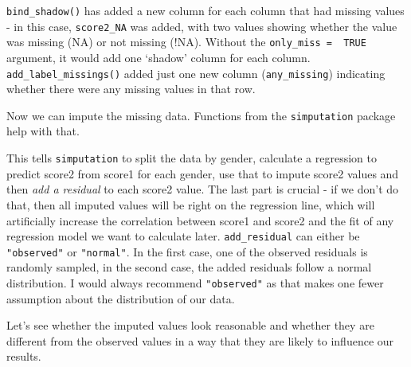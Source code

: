 \documentclass[
]{book}
\newenvironment{Shaded}{\begin{snugshade}}{\end{snugshade}}
\newcommand{\DataTypeTok}[1]{\textcolor[rgb]{0.13,0.29,0.53}{#1}}
\newcommand{\KeywordTok}[1]{\textcolor[rgb]{0.13,0.29,0.53}{\textbf{#1}}}
\newcommand{\NormalTok}[1]{#1}
\newcommand{\OperatorTok}[1]{\textcolor[rgb]{0.81,0.36,0.00}{\textbf{#1}}}
\newcommand{\StringTok}[1]{\textcolor[rgb]{0.31,0.60,0.02}{#1}}
\begin{document}
\texttt{bind\_shadow()} has added a new column for each column that had missing values - in this case, \texttt{score2\_NA} was added, with two values showing whether the value was missing (NA) or not missing (!NA). Without the \texttt{only\_miss\ =\ \ TRUE} argument, it would add one `shadow' column for each column. \texttt{add\_label\_missings()} added just one new column (\texttt{any\_missing}) indicating whether there were any missing values in that row.

Now we can impute the missing data. Functions from the \texttt{simputation} package help with that.

\begin{Shaded}
\end{Shaded}

This tells \texttt{simputation} to split the data by gender, calculate a regression to predict score2 from score1 for each gender, use that to impute score2 values and then \emph{add a residual} to each score2 value. The last part is crucial - if we don't do that, then all imputed values will be right on the regression line, which will artificially increase the correlation between score1 and score2 and the fit of any regression model we want to calculate later. \texttt{add\_residual} can either be \texttt{"observed"} or \texttt{"normal"}. In the first case, one of the observed residuals is randomly sampled, in the second case, the added residuals follow a normal distribution. I would always recommend \texttt{"observed"} as that makes one fewer assumption about the distribution of our data.

Let's see whether the imputed values look reasonable and whether they are different from the observed values in a way that they are likely to influence our results.

\begin{Shaded}
\end{Shaded}
\end{document}
